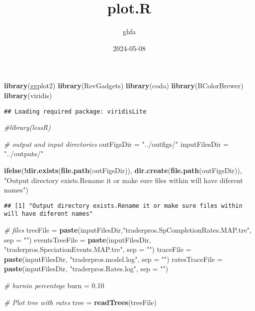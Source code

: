 \documentclass[
]{article}
\title{plot.R}
\author{ghfa}
\date{2024-05-08}
\newenvironment{Shaded}{\begin{snugshade}}{\end{snugshade}}
\newcommand{\AttributeTok}[1]{\textcolor[rgb]{0.13,0.29,0.53}{#1}}
\newcommand{\CommentTok}[1]{\textcolor[rgb]{0.56,0.35,0.01}{\textit{#1}}}
\newcommand{\FloatTok}[1]{\textcolor[rgb]{0.00,0.00,0.81}{#1}}
\newcommand{\FunctionTok}[1]{\textcolor[rgb]{0.13,0.29,0.53}{\textbf{#1}}}
\newcommand{\NormalTok}[1]{#1}
\newcommand{\OtherTok}[1]{\textcolor[rgb]{0.56,0.35,0.01}{#1}}
\newcommand{\SpecialCharTok}[1]{\textcolor[rgb]{0.81,0.36,0.00}{\textbf{#1}}}
\newcommand{\StringTok}[1]{\textcolor[rgb]{0.31,0.60,0.02}{#1}}
\begin{document}
\maketitle

\begin{Shaded}
\begin{Highlighting}[]
\FunctionTok{library}\NormalTok{(ggplot2)}
\FunctionTok{library}\NormalTok{(RevGadgets)}
\FunctionTok{library}\NormalTok{(coda)}
\FunctionTok{library}\NormalTok{(RColorBrewer)}
\FunctionTok{library}\NormalTok{(viridis)}
\end{Highlighting}
\end{Shaded}

\begin{verbatim}
## Loading required package: viridisLite
\end{verbatim}

\begin{Shaded}
\begin{Highlighting}[]
\CommentTok{\#library(lessR)}

\CommentTok{\# output and input directories}
\NormalTok{outFigsDir }\OtherTok{=} \StringTok{"../outfigs/"}
\NormalTok{inputFilesDir }\OtherTok{=} \StringTok{"../outputs/"}

\FunctionTok{ifelse}\NormalTok{(}\SpecialCharTok{!}\FunctionTok{dir.exists}\NormalTok{(}\FunctionTok{file.path}\NormalTok{(outFigsDir)), }\FunctionTok{dir.create}\NormalTok{(}\FunctionTok{file.path}\NormalTok{(outFigsDir)), }\StringTok{"Output directory exists.Rename it or make sure files within will have diferent names"}\NormalTok{)}
\end{Highlighting}
\end{Shaded}

\begin{verbatim}
## [1] "Output directory exists.Rename it or make sure files within will have diferent names"
\end{verbatim}

\begin{Shaded}
\begin{Highlighting}[]
\CommentTok{\# files}
\NormalTok{treeFile }\OtherTok{=} \FunctionTok{paste}\NormalTok{(inputFilesDir,}\StringTok{"traderpros.SpCompletionRates.MAP.tre"}\NormalTok{, }\AttributeTok{sep =} \StringTok{""}\NormalTok{)}
\NormalTok{eventsTreeFile }\OtherTok{=} \FunctionTok{paste}\NormalTok{(inputFilesDir, }\StringTok{"traderpros.SpeciationEvents.MAP.tre"}\NormalTok{, }\AttributeTok{sep =} \StringTok{""}\NormalTok{)}
\NormalTok{traceFile }\OtherTok{=} \FunctionTok{paste}\NormalTok{(inputFilesDir,  }\StringTok{"traderpros.model.log"}\NormalTok{, }\AttributeTok{sep =} \StringTok{""}\NormalTok{)}
\NormalTok{ratesTraceFile }\OtherTok{=} \FunctionTok{paste}\NormalTok{(inputFilesDir,  }\StringTok{"traderpros.Rates.log"}\NormalTok{, }\AttributeTok{sep =} \StringTok{""}\NormalTok{)}

\CommentTok{\# burnin percentege}
\NormalTok{burn }\OtherTok{=} \FloatTok{0.10}

\CommentTok{\# Plot tree with rates}
\NormalTok{tree }\OtherTok{=} \FunctionTok{readTrees}\NormalTok{(treeFile)}
\end{Highlighting}
\end{Shaded}
\end{document}
